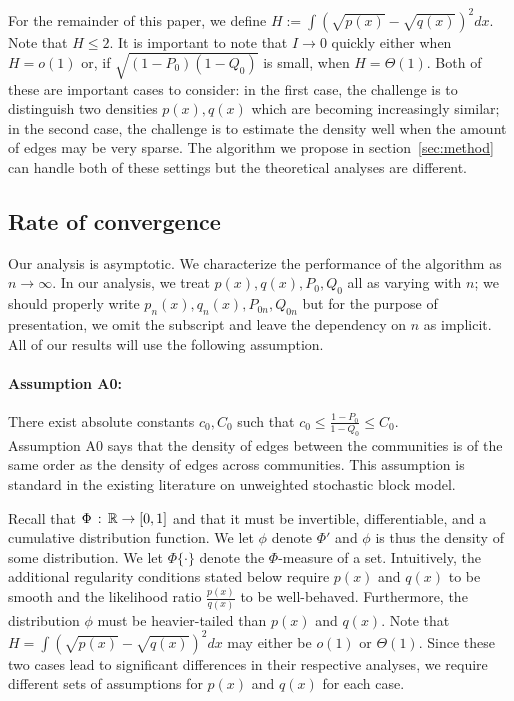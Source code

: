 For the remainder of this paper, we define $H := \int (\sqrt{p(x)} - \sqrt{q(x)})^2 dx$. Note that $H \leq 2$. It is important to note that $I \rightarrow 0$ quickly either when $H = o(1)$ or, if $\sqrt{(1-P_0)(1-Q_0)}$ is small, when $H = \Theta(1)$. Both of these are important cases to consider: in the first case, the challenge is to distinguish two densities $p(x), q(x)$ which are becoming increasingly similar; in the second case, the challenge is to estimate the density well when the amount of edges may be very sparse. The algorithm we propose in section~\ref{sec:method} can handle both of these settings but the theoretical analyses are different. 


\subsection{Rate of convergence}


Our analysis is asymptotic. We characterize the performance of the algorithm as $n \rightarrow \infty$. In our analysis, we treat $p(x), q(x), P_0, Q_0$ all as varying with $n$; we should properly write $p_n(x), q_n(x), P_{0n}, Q_{0n}$ but for the purpose of presentation, we omit the subscript and leave the dependency on $n$ as implicit. All of our results will use the following assumption.

\paragraph{\textbf{Assumption A0:}} There exist absolute constants $c_0, C_0$ such that $c_0 \leq \frac{1-P_0}{1-Q_0} \leq C_0$. \\

Assumption A0 says that the density of edges between the communities is of the same order as the density of edges across communities. This assumption is standard in the existing literature on unweighted stochastic block model. 


Recall that $\Phi \,:\, {\mathbb R} \rightarrow [0,1]$ and that it must be invertible, differentiable, and a cumulative distribution function. We let $\phi$ denote $\Phi'$ and $\phi$ is thus the density of some distribution. We let $\Phi \{ \cdot \}$ denote the $\Phi$-measure of a set. Intuitively, the additional regularity conditions stated below require $p(x)$ and $q(x)$ to be smooth and the likelihood ratio $\frac{p(x)}{q(x)}$ to be well-behaved. Furthermore, the distribution $\phi$ must be heavier-tailed than $p(x)$ and $q(x)$. Note that $H = \int (\sqrt{p(x)} - \sqrt{q(x)})^2 dx$ may either be $o(1)$ or $\Theta(1)$. Since these two cases lead to significant differences in their respective analyses, we require different sets of assumptions for $p(x)$ and $q(x)$ for each case.

